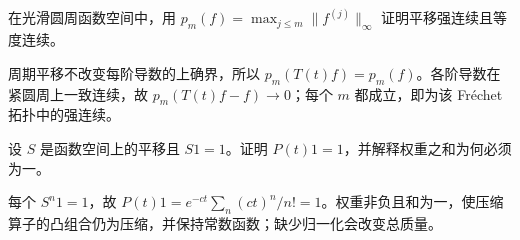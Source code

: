 \begin{exercise}[周期平移]\label{ex:y9-periodic}
在光滑圆周函数空间中，用 $p_m(f)=\max_{j\le m}\|f^{(j)}\|_\infty$ 证明平移强连续且等度连续。
\end{exercise}
\begin{solution}
周期平移不改变每阶导数的上确界，所以 $p_m(T(t)f)=p_m(f)$。各阶导数在紧圆周上一致连续，故 $p_m(T(t)f-f)\to0$；每个 $m$ 都成立，即为该 Fr\'echet 拓扑中的强连续。
\end{solution}

\begin{exercise}[跳跃过程的常数项]\label{ex:y9-poisson}
设 $S$ 是函数空间上的平移且 $S1=1$。证明 $P(t)1=1$，并解释权重之和为何必须为一。
\end{exercise}
\begin{solution}
每个 $S^n1=1$，故 $P(t)1=e^{-ct}\sum_n(ct)^n/n!=1$。权重非负且和为一，使压缩算子的凸组合仍为压缩，并保持常数函数；缺少归一化会改变总质量。
\end{solution}
